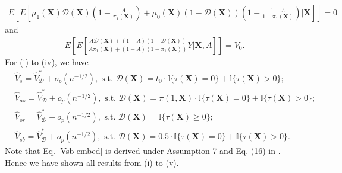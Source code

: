 \documentclass[11pt]{article}
\theoremstyle{referenceplain}
\theoremstyle{referencedefinition}
\theoremstyle{referenceremark}
\begin{document}
\begin{align*}
    E\left[E\left[\mu_1(\mathbf{X})\mathcal{D}(\mathbf{X})\left(1-\frac{A}{\pi_1(\mathbf{X})}\right)+\mu_0(\mathbf{X})(1-\mathcal{D}(\mathbf{X}))\left(1-\frac{1-A}{1-\pi_1(\mathbf{X})}\right)\bigg|\mathbf{X}\right]\right]=0
\end{align*}
and 
\begin{align*}
    E\left[E\left[\frac{A \mathcal{D}(\mathbf{X})+(1-A)(1-\mathcal{D}(\mathbf{X}))}{A\pi_1(\mathbf{X})+(1-A)(1-\pi_1(\mathbf{X}))}Y\bigg|\mathbf{X},A\right]\right]=V_0.
\end{align*}
For (i) to (iv), we have
\begin{align}
    &\widehat{V}_s = \widehat{V}_{\mathcal{D}}^*+o_p(n^{-1/2}), \text{ s.t. }\mathcal{D}(\mathbf{X}) = t_0\cdot\mathbb{I}\{\tau(\mathbf{X})=0\}+\mathbb{I}\{\tau(\mathbf{X})>0\};\\
     &\widehat{V}_{as} = \widehat{V}_{\mathcal{D}}^*+o_p(n^{-1/2}), \text{ s.t. }\mathcal{D}(\mathbf{X}) = \pi(1,\mathbf{X})\cdot\mathbb{I}\{\tau(\mathbf{X})=0\}+\mathbb{I}\{\tau(\mathbf{X})>0\};\\
     & \widehat{V}_{or} = \widehat{V}_{\mathcal{D}}^*+o_p(n^{-1/2}), \text{ s.t. }\mathcal{D}(\mathbf{X}) = \mathbb{I}\{\tau(\mathbf{X})\ge 0\};\\
     & \widehat{V}_{sb} = \widehat{V}_{\mathcal{D}}^*+o_p(n^{-1/2}), \text{ s.t. }\mathcal{D}(\mathbf{X}) = 0.5\cdot\mathbb{I}\{\tau(\mathbf{X})=0\}+\mathbb{I}\{\tau(\mathbf{X})>0\}.\label{Vsb-embed}
\end{align}
Note that Eq. \eqref{Vsb-embed} is derived under Assumption 7 and Eq. (16) in \citet{shi2020breaking}. Hence we have shown all results from (i) to (v).
\end{document}
